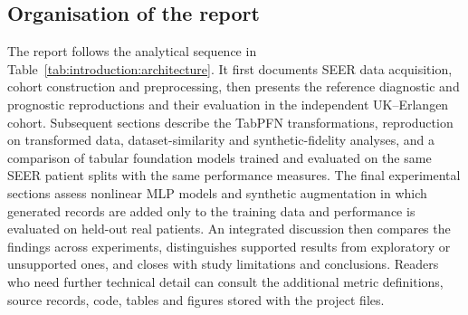 \subsection{Organisation of the report}
\label{sec:introduction:organisation}

The report follows the analytical sequence in Table~\ref{tab:introduction:architecture}.
It first documents SEER data acquisition, cohort construction and preprocessing,
then presents the reference diagnostic and prognostic reproductions and their
evaluation in the independent UK--Erlangen cohort. Subsequent sections describe
the TabPFN transformations, reproduction on transformed data,
dataset-similarity and synthetic-fidelity analyses, and a comparison of tabular
foundation models trained and evaluated on the same SEER patient splits with the
same performance measures. The final experimental sections assess nonlinear MLP models and
synthetic augmentation in which generated records are added only to the training
data and performance is evaluated on held-out real patients. An integrated discussion
then compares the findings across experiments, distinguishes supported results
from exploratory or unsupported ones, and closes with study limitations and
conclusions. Readers who need further technical detail can consult the additional
metric definitions, source records, code, tables and figures stored with the
project files.
